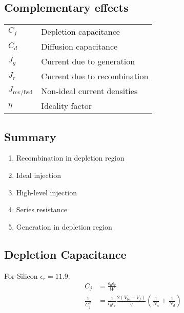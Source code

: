 \documentclass[a4paper, fontsize=8pt, landscape, DIV=1]{scrartcl}
\begin{document}
\begin{multicols*}{4}
    \section{Complementary effects}
    \begin{tabular}[h]{l l}
      $C_j$   & Depletion capacitance \\
      $C_d$   & Diffusion capacitance \\
      $J_g$   & Current due to generation \\
      $J_r$   & Current due to recombination \\
      $J_{\text{rev/fwd}}$ & Non-ideal current densities \\
      $\eta$  & Ideality factor \\
    \end{tabular}

    \subsection{Summary}
    \renewcommand{\labelenumi}{\alph{enumi})}
    \setlength{\fboxsep}{1pt}
    \begin{enumerate}[topsep=0pt,itemsep=-1ex,partopsep=1ex,parsep=1ex]
    \item \colorbox[rgb]{0.99,0.90,0.77}{Recombination in depletion region}
    \item \colorbox[rgb]{0.84,0.93,0.81}{Ideal injection}
    \item \colorbox[rgb]{0.75,0.85,0.99}{High-level injection}
    \item \colorbox[rgb]{0.89,0.75,0.93}{Series resistance}
    \item \colorbox[rgb]{0.98,0.79,0.78}{Generation in depletion region}
    \end{enumerate}

    
    \subsection{Depletion Capacitance}
    For Silicon $\epsilon_r = 11.9$.
    \begin{align*}
      C_j &= \frac{\epsilon_0\epsilon_r}{W} \\
      \frac{1}{C_j^2} &= \frac{1}{\epsilon_0\epsilon_r} \frac{2(V_{bi}-V_f)}{q} \left( \frac{1}{N_a} + \frac{1}{N_d}\right) \\
    \end{align*}


\end{multicols*}
\end{document}
